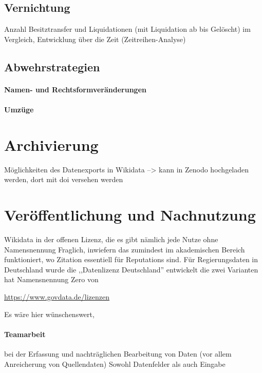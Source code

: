 \subsection{Vernichtung}
Anzahl Besitztransfer und Liquidationen (mit Liquidation ab bis Gelöscht) im Vergleich, Entwicklung über die Zeit (Zeitreihen-Analyse)
\paragraph{}
\subsection{Abwehrstrategien}
\paragraph{Namen- und Rechtsformveränderungen}
\paragraph{Umzüge}
\section{Archivierung}
Möglichkeiten des Datenexports in Wikidata --> kann in Zenodo hochgeladen werden, dort mit doi versehen werden




  
\section{Veröffentlichung und Nachnutzung}

Wikidata in der offenen Lizenz, die es gibt nämlich jede Nutze ohne Namensnennung
Fraglich, inwiefern das zumindest im akademischen Bereich funktioniert, wo Zitation essentiell für Reputations sind.
Für Regierungsdaten in Deutschland wurde die ,,Datenlizenz Deutschland'' entwickelt die zwei Varianten hat
Namensnennung
Zero 
von  



\url{https://www.govdata.de/lizenzen}

Es wäre hier wünschenswert, 

\paragraph{Teamarbeit}
bei der Erfassung und nachträglichen Bearbeitung von Daten (vor allem Anreicherung von Quellendaten)
Sowohl Datenfelder als auch Eingabe

